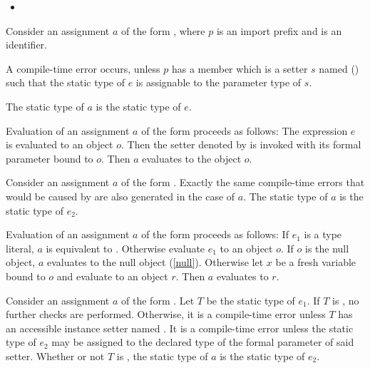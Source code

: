 \documentclass[makeidx]{article}
\begin{document}
{\begin{itemize}
\item
\end{itemize}
\EndCase

\LMHash{}%
Consider an assignment $a$ of the form ,
where $p$ is an import prefix and \id{} is an identifier.

\LMHash{}%
A compile-time error occurs,
unless $p$ has a member which is a setter $s$ named 
()
such that the static type of $e$
is assignable to the parameter type of $s$.

\LMHash{}%
The static type of $a$ is the static type of $e$.

\LMHash{}%
\LMHash{}%
Evaluation of an assignment $a$ of the form 
proceeds as follows:
The expression $e$ is evaluated to an object $o$.
Then the setter denoted by  is invoked
with its formal parameter bound to $o$.
Then $a$ evaluates to the object $o$.
\EndCase

\LMHash{}%
Consider an assignment $a$ of the form .
Exactly the same compile-time errors that would be caused by
 are also generated in the case of $a$.
The static type of $a$ is the static type of $e_2$.

\LMHash{}%
Evaluation of an assignment $a$ of the form 
proceeds as follows:
If $e_1$ is a type literal, $a$ is equivalent to .
Otherwise evaluate $e_1$ to an object $o$.
If $o$ is the null object, $a$ evaluates to the null object (\ref{null}).
Otherwise let $x$ be a fresh variable bound to $o$
and evaluate  to an object $r$.
Then $a$ evaluates to $r$.
\EndCase

\LMHash{}%
Consider an assignment $a$ of the form .
Let $T$ be the static type of $e_1$.
If $T$ is \DYNAMIC, no further checks are performed.
Otherwise, it is a compile-time error unless
$T$ has an accessible instance setter named .
It is a compile-time error unless the static type of $e_2$
may be assigned to the declared type of the formal parameter of said setter.
Whether or not $T$ is \DYNAMIC,
the static type of $a$ is the static type of $e_2$.

}
\end{document}
